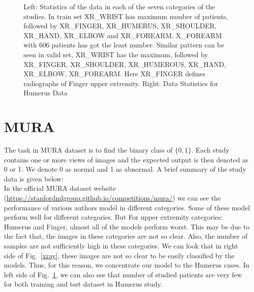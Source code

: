 \documentclass{article}
\begin{document}
\begin{figure}[t]
\hspace{0.1\textwidth}
\caption{Left: Statistics of the data in each of the seven categories of the studies. In train set XR\_WRIST has maximum number of patients, followed by XR\_FINGER, XR\_HUMERUS, XR\_SHOULDER, XR\_HAND, XR\_ELBOW and XR\_FOREARM. X\_FOREARM with 606 patients has got the least number. Similar pattern can be seen in valid set, XR\_WRIST has the maximum, followed by XR\_FINGER, XR\_SHOULDER, XR\_HUMEROUS, XR\_HAND, XR\_ELBOW, XR\_FOREARM. Here XR\_FINGER defines radiographs of  Finger upper extremity. Right: Data Statistics for Humerus Data}
\label{distribution}
\end{figure}

\section{MURA}
The task in MURA dataset is to find the binary class of $\{0,1\}$. Each study contains one or more views of images and the expected output is then denoted as 0 or 1. We denote 0 as normal and 1 as abnormal. A brief summary of the study data is given below:\\
In the official MURA dataset website (\url{https://stanfordmlgroup.github.io/competitions/mura/}) we can see the performance of various authors model in different categories. Some of these model perform well for different categories. But For upper extremity categories: Humerus and Finger, almost all of the models perform worst. This may be due to the fact that, the images in these categories are not so clear. Also, the number of samples are not sufficiently high in these categories. We can look that in right side of Fig.~\ref{xray}, these images are not so clear to be easily classified by the models. Thus, for this reason, we concentrate our model to the Humerus cases. In left side of Fig.~\ref{distribution}, we can also see that number of studied patients are very few for both training and test dataset in Humerus study.
\end{document}
